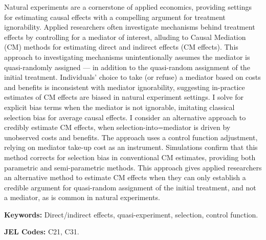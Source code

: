 \noindent
Natural experiments are a cornerstone of applied economics, providing settings for estimating causal effects with a compelling argument for treatment ignorability.
Applied researchers often investigate mechanisms behind treatment effects by controlling for a mediator of interest, alluding to Causal Mediation (CM) methods for estimating direct and indirect effects (CM effects).
This approach to investigating mechanisms unintentionally assumes the mediator is quasi-randomly assigned --- in addition to the quasi-random assignment of the initial treatment.
Individuals' choice to take (or refuse) a mediator based on costs and benefits is inconsistent with mediator ignorability, suggesting in-practice estimates of CM effects are biased in natural experiment settings.
I solve for explicit bias terms when the mediator is not ignorable, imitating classical selection bias for average causal effects.
I consider an alternative approach to credibly estimate CM effects, when selection-into=mediator is driven by unobserved costs and benefits.
The approach uses a control function adjustment, relying on mediator take-up cost as an instrument.
Simulations confirm that this method corrects for selection bias in conventional CM estimates, providing both parametric and semi-parametric methods.
This approach gives applied researchers an alternative method to estimate CM effects when they can only establish a credible argument for quasi-random assignment of the initial treatment, and not a mediator, as is common in natural experiments.

\vspace{0.5cm}
\noindent
\textbf{Keywords:}
Direct/indirect effects, quasi-experiment, selection, control function.

\vspace{0.1cm}
\noindent
\textbf{JEL Codes:}
C21, C31.
